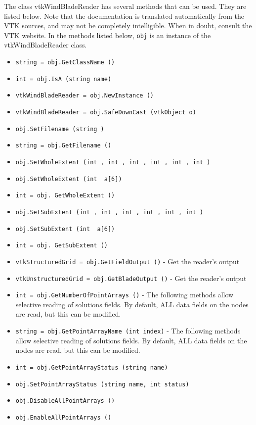 The class vtkWindBladeReader has several methods that can be used.
  They are listed below.
Note that the documentation is translated automatically from the VTK sources,
and may not be completely intelligible.  When in doubt, consult the VTK website.
In the methods listed below, \verb|obj| is an instance of the vtkWindBladeReader class.
\begin{itemize}
\item  \verb|string = obj.GetClassName ()|

\item  \verb|int = obj.IsA (string name)|

\item  \verb|vtkWindBladeReader = obj.NewInstance ()|

\item  \verb|vtkWindBladeReader = obj.SafeDownCast (vtkObject o)|

\item  \verb|obj.SetFilename (string )|

\item  \verb|string = obj.GetFilename ()|

\item  \verb|obj.SetWholeExtent (int , int , int , int , int , int )|

\item  \verb|obj.SetWholeExtent (int  a[6])|

\item  \verb|int = obj. GetWholeExtent ()|

\item  \verb|obj.SetSubExtent (int , int , int , int , int , int )|

\item  \verb|obj.SetSubExtent (int  a[6])|

\item  \verb|int = obj. GetSubExtent ()|

\item  \verb|vtkStructuredGrid = obj.GetFieldOutput ()| -  Get the reader's output

\item  \verb|vtkUnstructuredGrid = obj.GetBladeOutput ()| -  Get the reader's output

\item  \verb|int = obj.GetNumberOfPointArrays ()| -  The following methods allow selective reading of solutions fields.
 By default, ALL data fields on the nodes are read, but this can
 be modified.

\item  \verb|string = obj.GetPointArrayName (int index)| -  The following methods allow selective reading of solutions fields.
 By default, ALL data fields on the nodes are read, but this can
 be modified.

\item  \verb|int = obj.GetPointArrayStatus (string name)|

\item  \verb|obj.SetPointArrayStatus (string name, int status)|

\item  \verb|obj.DisableAllPointArrays ()|

\item  \verb|obj.EnableAllPointArrays ()|

\end{itemize}
